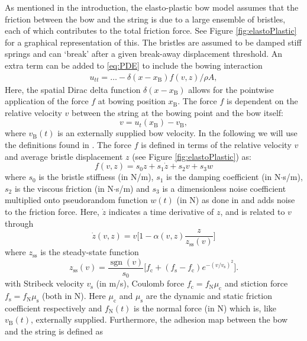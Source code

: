 \documentclass[twoside,a4paper,dvipsnames]{article}
\DeclareMathOperator{\sgn}{sgn}
\begin{document}
As mentioned in the introduction, the elasto-plastic bow model assumes that the friction between the bow and the string is due to a large ensemble of bristles, each of which contributes to the total friction force. See Figure \ref{fig:elastoPlastic} for a graphical representation of this. The bristles are assumed to be damped stiff springs and can `break' after a given break-away displacement threshold. An extra term can be added to \eqref{eq:PDE} to include the bowing interaction
\begin{equation}
    \begin{aligned}
    \label{eq:bowingTerm}
        u_{tt} = \hdots - \delta(x-x_\text{B})f(v, z)/\rho A,
    \end{aligned}
\end{equation}
Here, the spatial Dirac delta function $\delta(x-x_\text{B})$ allows for the pointwise application of the force $f$ at bowing position $x_\text{B}$. The force $f$ is dependent on the relative velocity $v$ between the string at the bowing point and the bow itself:
\begin{equation}\label{eq:relVel}
  v = u_t(x_\text{B}) - v_\text{B},
\end{equation}
where $v_\text{B}(t)$ is an externally supplied bow velocity. In the following we will use the definitions found in \cite{Dupont2002}. The force $f$ is defined in terms of the relative velocity $v$ and average bristle displacement $z$ (see Figure \ref{fig:elastoPlastic}) as:
\begin{equation}\label{eq:forceFunction}
    f(v, z) = s_0z + s_1\dot z + s_2v + s_3w
\end{equation}
where $s_0$ is the bristle stiffness (in N/m), $s_1$ is the damping coefficient (in N$\cdot$s/m), $s_2$ is the viscous friction (in N$\cdot$s/m) and $s_3$ is a dimensionless noise coefficient multiplied onto pseudorandom function $w(t)$ (in N) as done in \cite{Serafin2004} and adds noise to the friction force. Here, $\dot{z}$ indicates a time derivative of $z$, and is related to $v$ through
\begin{equation}\label{eq:zdot}
    \dot z(v, z) = v \bigg[ 1-  \alpha(v, z)\frac{z}{z_\text{ss}(v)}\bigg ]
\end{equation}
where $z_\text{ss}$ is the steady-state function
\begin{equation}
    z_\text{ss}(v) = \frac{\sgn(v)}{s_0}\Big[f_\text{c}+(f_\text{s}-f_\text{c})e^{-(v/v_\text{s})^2}\Big].
\end{equation}
with Stribeck velocity $v_\text{s}$ (in m/s), Coulomb force $f_\text{c} = f_\text{N}\mu_\text{c}$ and stiction force $f_\text{s} = f_\text{N}\mu_\text{s}$ (both in N). Here $\mu_\text{c}$ and $\mu_\text{s}$ are the dynamic and static friction coefficient respectively and $f_\text{N}(t)$ is the normal force (in N) which is, like $v_\text{B}(t)$, externally supplied. Furthermore, the adhesion map between the bow and the string is defined as
\end{document}
